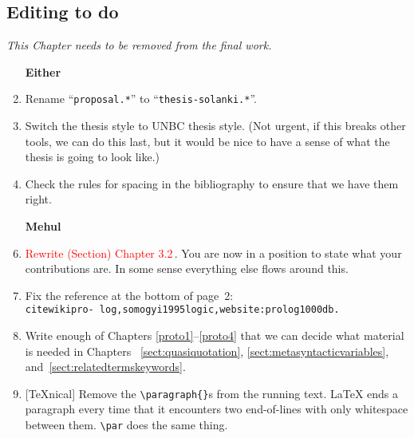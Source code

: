 
\begin{scope}
\nolinenumbers
\section{Editing to do}\label{sect:to-do}

\textit{\color{red} This Chapter needs to be removed from the final
  work.}

\begin{enumerate}
\item [\textbf{Either}]
\item Rename ``\Verb!proposal.*!'' to ``\Verb!thesis-solanki.*!''.
\item Switch the thesis style to UNBC thesis style.  (Not urgent, if
  this breaks other tools, we can do this last, but it would be nice to
  have a sense of what the thesis is going to look like.)
\item
  Check the rules for spacing in the bibliography to ensure that we have
  them right.
  
\item [\textbf{Mehul}]

\item
  \textcolor{red}{Rewrite (Section) Chapter 3.2}\,.
  You are now in a position to state what your contributions are.
  In some sense everything else flows around this.

\item
  Fix the reference at the bottom of page~2:\\
  \Verb!citewikipro- log,somogyi1995logic,website:prolog1000db.!
\item
  Write enough of Chapters \ref{proto1}--\ref{proto4} that we can decide
  what material is needed in Chapters~ \ref{sect:quasiquotation},
  \ref{sect:metasyntacticvariables},
  and~\ref{sect:relatedtermskeywords}.
\item
  {}[\TeX{}nical]
  Remove the \Verb!\paragraph{}!s from the running text.  \LaTeX{}
  ends a paragraph every time that it encounters two end-of-lines
  with only whitespace between them.  \Verb!\par! does the same thing.


\end{enumerate}
\end{scope}
